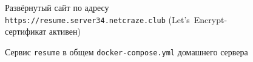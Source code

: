 \begin{figure}[h]
  \centering
  \caption{Развёрнутый сайт по адресу
           \texttt{https://resume.server34.netcraze.club}
           (Let's~Encrypt-сертификат активен)}
  \label{fig:resume_live}
\end{figure}

\begin{figure}[h]
  \centering
  \caption{Сервис \texttt{resume} в общем \texttt{docker-compose.yml}
           домашнего сервера}
  \label{fig:compose_ps}
\end{figure}

\endinput
